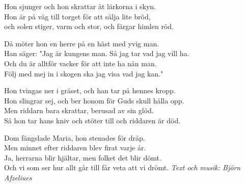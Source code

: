 \vspace{10pt}
Hon sjunger och hon skrattar åt lärkorna i skyn.\\
Hon är på väg till torget för att sälja lite bröd,\\ 
och solen stiger, varm och stor, och färgar himlen röd.\par
\vspace{10pt}
Då möter hon en herre på en häst med yvig man.\\
Han säger: "Jag är kungens man. Så jag tar vad jag vill ha.\\ 
Och du är alltför vacker för att inte ha nån man.\\
Följ med mej in i skogen ska jag visa vad jag kan."\par
\vspace{10pt}
Hon tvingas ner i gräset, och han tar på hennes kropp.\\
Hon slingrar sej, och ber honom för Guds skull hålla opp.\\
Men riddarn bara skrattar, berusad av sin glöd.\\
Så hon tar hans kniv och stöter till och riddaren är död.\par
\vspace{10pt}
Dom fängslade Maria, hon stenades för dråp.\\
Men minnet efter riddaren blev firat varje år.\\
Ja, herrarna blir hjältar, men folket det blir dömt.\\
Och vi som ser hur allt går till får veta att vi drömt.
\vspace{10pt}
{\footnotesize\textit{Text och musik: Björn Afzeliues}}



 
